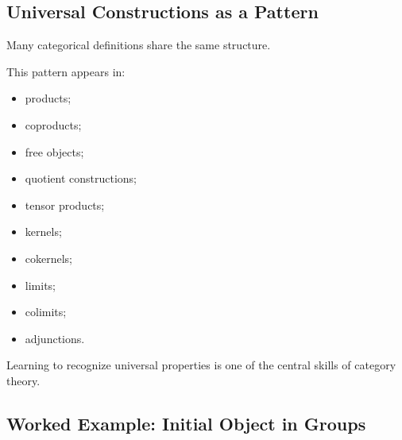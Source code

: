 \subsection{Universal Constructions as a Pattern}
\label{subsec:universal-construction-pattern}

Many categorical definitions share the same structure.

\begin{center}
\end{center}

This pattern appears in:

\begin{itemize}
    \item products;
    \item coproducts;
    \item free objects;
    \item quotient constructions;
    \item tensor products;
    \item kernels;
    \item cokernels;
    \item limits;
    \item colimits;
    \item adjunctions.
\end{itemize}

Learning to recognize universal properties is one of the central skills of
category theory.

\subsection{Worked Example: Initial Object in Groups}
\label{subsec:worked-initial-group}

